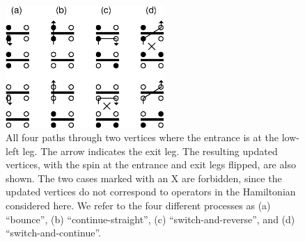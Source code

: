 \documentclass[10pt,pre,aps,twocolumn,showpacs,superscriptaddress,
floatfix]{revtex4}
\begin{document}
\begin{figure}
\includegraphics[clip,width=6cm]{fig3.eps}
\caption{All four paths through two vertices where the entrance is at the 
low-left leg. The arrow indicates the exit leg. The resulting updated vertices,
with the spin at the entrance and exit legs flipped, are also shown. The
two cases marked with an X are forbidden, since the updated vertices do 
not correspond to operators in the Hamiltonian considered here. We refer
to the four different processes as (a) ``bounce'', (b) ``continue-straight'',
(c) ``switch-and-reverse'', and (d) ``switch-and-continue''.}
\label{vpaths}
\end{figure}
\end{document}
